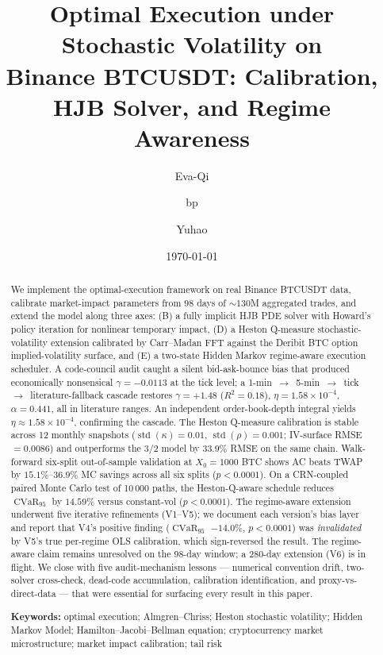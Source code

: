 \documentclass[11pt,letterpaper]{article}
\title{Optimal Execution under Stochastic Volatility on \\
       Binance BTCUSDT: Calibration, HJB Solver, and Regime Awareness}
\author[1]{Eva-Qi}
\author[1]{bp}
\author[1]{Yuhao}
\affil[1]{MF796 Computational Methods of Mathematical Finance, Boston University}
\date{\today}
\newcommand{\CVaR}{\operatorname{CVaR}}
\newcommand{\HJB}{HJB}
\begin{document}
\maketitle

\begin{abstract}
\noindent
We implement the \citet{almgren2001optimal} optimal-execution framework on real Binance BTCUSDT data, calibrate market-impact parameters from \(98\) days of \(\sim 130\)M aggregated trades, and extend the model along three axes: (B) a fully implicit \HJB{} PDE solver with Howard's policy iteration for nonlinear temporary impact, (D) a Heston Q-measure stochastic-volatility extension calibrated by Carr--Madan FFT \citep{carr1999option} against the Deribit BTC option implied-volatility surface, and (E) a two-state Hidden Markov regime-aware execution scheduler. A code-council audit caught a silent bid-ask-bounce bias that produced economically nonsensical \(\gamma = -0.0113\) at the tick level; a 1-min~\(\to\)~5-min~\(\to\)~tick~\(\to\)~literature-fallback cascade restores \(\gamma=+1.48\) (\(R^2=0.18\)), \(\eta=1.58\!\times\!10^{-4}\), \(\alpha=0.441\), all in literature ranges. An independent order-book-depth integral yields \(\eta\approx1.58\!\times\!10^{-4}\), confirming the cascade. The Heston Q-measure calibration is stable across 12 monthly snapshots (\(\operatorname{std}(\kappa)=0.01\), \(\operatorname{std}(\rho)=0.001\); IV-surface RMSE \(=0.0086\)) and outperforms the 3/2 model by 33.9\% RMSE on the same chain. Walk-forward six-split out-of-sample validation at \(X_0=1000\) BTC shows AC beats TWAP by \(15.1\%\)--\(36.9\%\) MC savings across all six splits (\(p<0.0001\)). On a CRN-coupled paired Monte Carlo test of 10\,000 paths, the Heston-Q-aware schedule reduces \(\CVaR_{95}\) by \(14.59\%\) versus constant-vol (\(p<0.0001\)). The regime-aware extension underwent five iterative refinements (V1--V5); we document each version's bias layer and report that V4's positive finding (\(\CVaR_{95}\) \(-14.0\%\), \(p<0.0001\)) was \emph{invalidated} by V5's true per-regime OLS calibration, which sign-reversed the result. The regime-aware claim remains unresolved on the 98-day window; a 280-day extension (V6) is in flight. We close with five audit-mechanism lessons --- numerical convention drift, two-solver cross-check, dead-code accumulation, calibration identification, and proxy-vs-direct-data --- that were essential for surfacing every result in this paper.

\medskip
\noindent\textbf{Keywords:} optimal execution; Almgren--Chriss; Heston stochastic volatility; Hidden Markov Model; Hamilton--Jacobi--Bellman equation; cryptocurrency market microstructure; market impact calibration; tail risk
\end{abstract}
\end{document}
